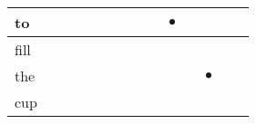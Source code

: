 \documentclass[landscape]{article}
\newcommand{\ssp}{\hspace{2pt}}
\newcommand{\mex}{\cellcolor{g}$\bullet$}
\begin{document}
\begin{tabular}{|l|p{10pt}|p{10pt}|p{10pt}|p{10pt}|p{10pt}|p{10pt}|p{10pt}|p{10pt}|p{10pt}|p{10pt}|p{10pt}|p{10pt}|p{10pt}|}
\hline
\ssp \cellcolor{ref8}to \ssp&\hspace{2pt}&\hspace{2pt}&\hspace{2pt}&\hspace{2pt}&\hspace{2pt}&\hspace{2pt}&\hspace{2pt}&\hspace{2pt}&\hspace{2pt}\mex&\hspace{2pt}&\hspace{2pt}&\hspace{2pt}&\hspace{2pt}\\
\hline
\ssp fill \ssp&\hspace{2pt}&\hspace{2pt}&\hspace{2pt}&\hspace{2pt}&\hspace{2pt}&\hspace{2pt}&\hspace{2pt}&\hspace{2pt}&\hspace{2pt}&\hspace{2pt}&\hspace{2pt}&\hspace{2pt}&\hspace{2pt}\\
\hline
\ssp \cellcolor{ref10}the \ssp&\hspace{2pt}&\hspace{2pt}&\hspace{2pt}&\hspace{2pt}&\hspace{2pt}&\hspace{2pt}&\hspace{2pt}&\hspace{2pt}&\hspace{2pt}&\hspace{2pt}&\hspace{2pt}\mex&\hspace{2pt}&\hspace{2pt}\\
\hline
\ssp cup \ssp&\hspace{2pt}&\hspace{2pt}&\hspace{2pt}&\hspace{2pt}&\hspace{2pt}&\hspace{2pt}&\hspace{2pt}&\hspace{2pt}&\hspace{2pt}&\hspace{2pt}&\hspace{2pt}&\hspace{2pt}&\hspace{2pt}\\

\end{tabular}
\end{document}
